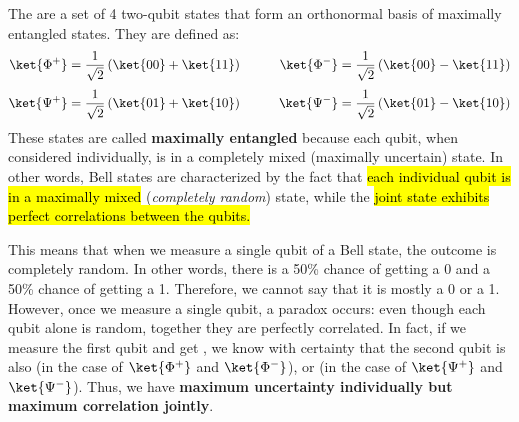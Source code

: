\newpage

\begin{definitionbox}
    The  are a set of 4 two-qubit states that form an orthonormal basis of maximally entangled states. They are defined as:
    \begin{equation}\label{eq:bell-states}
        \begin{aligned}
            \ket{\Phi^+} &= \frac{1}{\sqrt{2}}\left(\ket{00} + \ket{11}\right) \qquad &\ket{\Phi^-} = \frac{1}{\sqrt{2}}\left(\ket{00} - \ket{11}\right) \\[.3em]
            \ket{\Psi^+} &= \frac{1}{\sqrt{2}}\left(\ket{01} + \ket{10}\right) \qquad &\ket{\Psi^-} = \frac{1}{\sqrt{2}}\left(\ket{01} - \ket{10}\right)
        \end{aligned}
    \end{equation}
    These states are called \textbf{maximally entangled} because each qubit, when considered individually, is in a completely mixed (maximally uncertain) state. In other words, Bell states are characterized by the fact that \hl{each individual qubit is in a maximally mixed} (\emph{completely random}) state, while the \hl{joint state exhibits perfect correlations between the qubits.}

    \highspace
    This means that when we measure a single qubit of a Bell state, the outcome is completely random. In other words, there is a 50\% chance of getting a 0 and a 50\% chance of getting a 1. Therefore, we cannot say that it is mostly a 0 or a 1. However, once we measure a single qubit, a paradox occurs: even though each qubit alone is random, together they are perfectly correlated. In fact, if we measure the first qubit and get , we know with certainty that the second qubit is also  (in the case of $\ket{\Phi^{+}}$ and $\ket{\Phi^{-}}$), or  (in the case of $\ket{\Psi^{+}}$ and $\ket{\Psi^{-}}$). Thus, we have \textbf{maximum uncertainty individually but maximum correlation jointly}.
\end{definitionbox}

